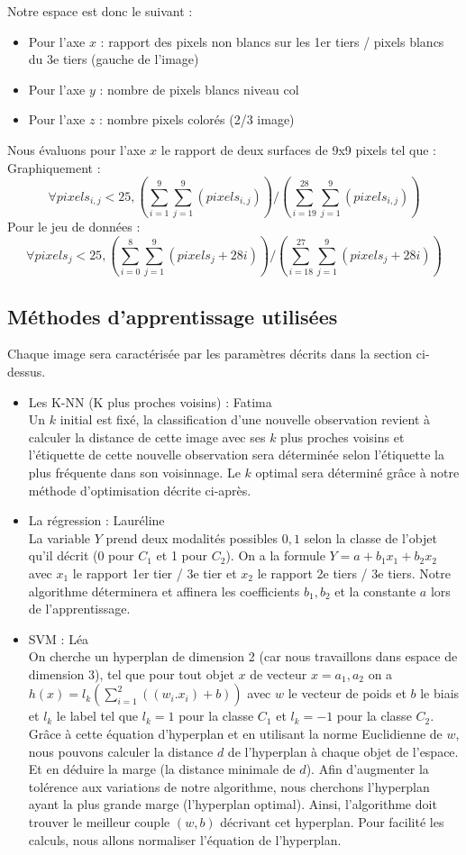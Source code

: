 \documentclass[a4paper,10pt]{article}
\begin{document}
		Notre espace est donc le suivant :
		\begin{itemize}
			\item Pour l'axe $x$ : rapport des pixels non blancs sur les 1er tiers / pixels blancs du 3e tiers (gauche de l'image)
			\item Pour l'axe $y$ : nombre de pixels blancs niveau col
			\item Pour l'axe $z$ : nombre pixels colorés (2/3 image)
		\end{itemize}
		Nous évaluons pour l'axe $x$ le rapport de deux surfaces de 9x9 pixels tel que : \\
		Graphiquement :
		$$ \forall pixels_{i,j} < 25,  (\sum_{i=1} ^9 \sum_{j=1} ^9  (pixels_{i,j})) / (\sum_{i=19} ^{28} \sum_{j=1}^9  (pixels_{i,j}) ) $$
		Pour le jeu de données :
		$$ \forall pixels_j < 25, (\sum_{i=0} ^8 \sum_{j=1} ^9  (pixels_j +28i) ) / (\sum_{i=18} ^{27} \sum_{j=1} ^9  (pixels_j+28i) ) $$

	\subsection{Méthodes d'apprentissage utilisées}
		Chaque image sera caractérisée par les paramètres décrits dans la section ci- dessus. 
		\begin{itemize}
			\item Les K-NN (K plus proches voisins) : Fatima\\
			Un $k$ initial est fixé, la classification d'une nouvelle observation revient à calculer la distance de cette image avec ses $k$ plus proches voisins et l'étiquette de cette nouvelle observation sera déterminée selon l'étiquette la plus fréquente dans son voisinnage. Le $k$ optimal sera déterminé grâce à notre méthode d'optimisation décrite ci-après.\\
			\item La régression : Lauréline\\
			La variable $Y$ prend deux modalités possibles ${0, 1}$ selon la classe de l'objet qu'il décrit (0 pour $C_1$ et 1 pour $C_2$). On a la formule $Y = a + b_1 x_1+ b_2 x_2$ avec $x_1$ le rapport 1er tier / 3e tier et $x_2$ le rapport 2e tiers / 3e tiers. Notre algorithme déterminera et affinera les coefficients $b_1, b_2$ et la constante $a$ lors de l'apprentissage.
			\item SVM : Léa\\
			On cherche un hyperplan de dimension 2 (car nous travaillons dans espace de dimension 3), tel que pour tout objet $x$ de vecteur $x = {a_1, a_2} $ on a $h(x) = l_k (\sum_{i = 1} ^2 ((w_i . x_i ) + b ) )$ avec $w$ le vecteur de poids et $b$ le biais et $l_k$ le label tel que $l_k = 1 $ pour la classe $C_1$ et $l_k = -1$ pour la classe $C_2$. Grâce à cette équation d'hyperplan et en utilisant la norme Euclidienne de $w$, nous pouvons calculer la distance $d$ de l'hyperplan à chaque objet de l'espace. Et en déduire la marge (la distance minimale de $d$). Afin d'augmenter la tolérence aux variations de notre algorithme, nous cherchons l'hyperplan ayant la plus grande marge (l'hyperplan optimal). Ainsi, l'algorithme doit trouver le meilleur couple $(w, b)$ décrivant cet hyperplan. Pour facilité les calculs, nous allons normaliser l'équation de l'hyperplan.
		\end{itemize}
\end{document}

